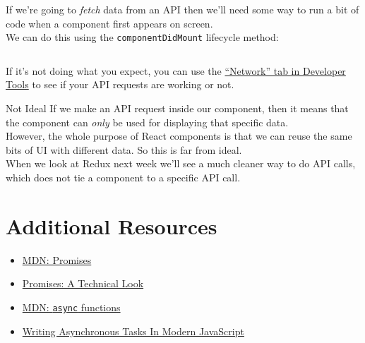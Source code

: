 If we're going to \textit{fetch} data from an API then we'll need some way to run a bit of code when a component first appears on screen.
\\

We can do this using the \texttt{componentDidMount} lifecycle method:

\inputminted{js}{03-async/figures/01-StarWarsFolks.jsx}

If it's not doing what you expect, you can use the \href{https://developer.mozilla.org/en-US/docs/Tools/Network_Monitor}{``Network'' tab in Developer Tools} to see if your API requests are working or not.

\begin{infobox}{Not Ideal}
    If we make an API request inside our component, then it means that the component can \textit{only} be used for displaying that specific data.
    \\

    However, the whole purpose of React components is that we can reuse the same bits of UI with different data. So this is far from ideal.
    \\

    When we look at Redux next week we'll see a much cleaner way to do API calls, which does not tie a component to a specific API call.
\end{infobox}

\section{Additional Resources}

\begin{itemize}[leftmargin=*]
    \item \href{https://developer.mozilla.org/en-US/docs/Web/JavaScript/Reference/Global_Objects/Promise}{MDN: Promises}
    \item \href{http://exploringjs.com/es6/ch_promises.html}{Promises: A Technical Look}
    \item \href{https://developer.mozilla.org/en-US/docs/Web/JavaScript/Reference/Statements/async_function}{MDN: \texttt{async} functions}
    \item \href{https://www.smashingmagazine.com/2019/10/asynchronous-tasks-modern-javascript/}{Writing Asynchronous Tasks In Modern JavaScript}
\end{itemize}

